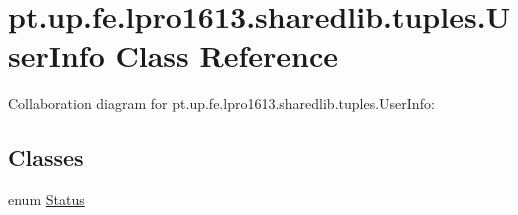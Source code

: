 \hypertarget{classpt_1_1up_1_1fe_1_1lpro1613_1_1sharedlib_1_1tuples_1_1_user_info}{}\section{pt.\+up.\+fe.\+lpro1613.\+sharedlib.\+tuples.\+User\+Info Class Reference}
\label{classpt_1_1up_1_1fe_1_1lpro1613_1_1sharedlib_1_1tuples_1_1_user_info}


Collaboration diagram for pt.\+up.\+fe.\+lpro1613.\+sharedlib.\+tuples.\+User\+Info\+:
\subsection*{Classes}
\begin{DoxyCompactItemize}
\item 
enum \hyperlink{enumpt_1_1up_1_1fe_1_1lpro1613_1_1sharedlib_1_1tuples_1_1_user_info_1_1_status}{Status}
\end{DoxyCompactItemize}
